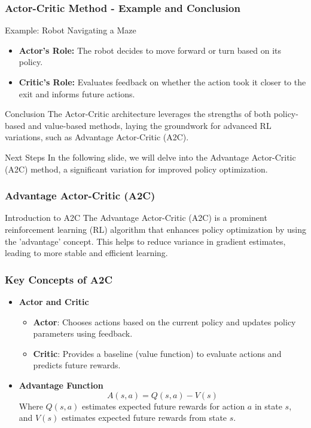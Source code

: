 \documentclass{beamer}
\begin{document}
\begin{frame}[fragile]
    \frametitle{Actor-Critic Method - Example and Conclusion}
    \begin{block}{Example: Robot Navigating a Maze}
        \begin{itemize}
            \item \textbf{Actor's Role:} The robot decides to move forward or turn based on its policy.
            \item \textbf{Critic's Role:} Evaluates feedback on whether the action took it closer to the exit and informs future actions.
        \end{itemize}
    \end{block}

    \begin{block}{Conclusion}
        The Actor-Critic architecture leverages the strengths of both policy-based and value-based methods, laying the groundwork for advanced RL variations, such as Advantage Actor-Critic (A2C).
    \end{block}

    \begin{block}{Next Steps}
        In the following slide, we will delve into the Advantage Actor-Critic (A2C) method, a significant variation for improved policy optimization.
    \end{block}
\end{frame}

\begin{frame}[fragile]
    \frametitle{Advantage Actor-Critic (A2C)}
    \begin{block}{Introduction to A2C}
        The Advantage Actor-Critic (A2C) is a prominent reinforcement learning (RL) algorithm that enhances policy optimization by using the 'advantage' concept. This helps to reduce variance in gradient estimates, leading to more stable and efficient learning.
    \end{block}
\end{frame}

\begin{frame}[fragile]
    \frametitle{Key Concepts of A2C}
    \begin{itemize}
        \item \textbf{Actor and Critic}
        \begin{itemize}
            \item \textbf{Actor}: Chooses actions based on the current policy and updates policy parameters using feedback.
            \item \textbf{Critic}: Provides a baseline (value function) to evaluate actions and predicts future rewards.
        \end{itemize}
        \item \textbf{Advantage Function}
        \begin{equation}
            A(s, a) = Q(s, a) - V(s)
        \end{equation}
        Where \( Q(s, a) \) estimates expected future rewards for action \( a \) in state \( s \), and \( V(s) \) estimates expected future rewards from state \( s \).
    \end{itemize}
\end{frame}
\end{document}
